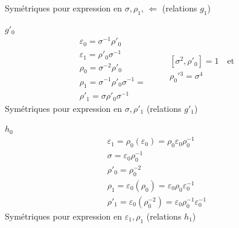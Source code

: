 Symétriques pour expression en $\sigma,\rho_1$, $\Leftarrow$ (relations $g_1$)

\textcircled{$g'_0$}
\[
\begin{gathered}
\varepsilon_0=\sigma^{-1}\rho'_0\\
\varepsilon_1=\rho'_0\sigma^{-1}\\
\rho_0=\sigma^{-2}\rho'_0\\
\rho_1=\sigma^{-1}\rho'_0\sigma^{-1}=\\
\rho'_1=\sigma\rho'_0\sigma^{-1}
\end{gathered}
\qquad\boxed{\begin{gathered}[\sigma^2,\rho'_0]=1\quad\text{et}\\\rho_0'{}^3=\sigma^4\end{gathered}}
\]
Symétriques pour expression en $\sigma,\rho'_1$ (relations $g'_1$)

\textcircled{$h_0$}
\[
\begin{gathered}
\varepsilon_1=\rho_0(\varepsilon_0)=\rho_0\varepsilon_0\rho_0^{-1}\\
\sigma=\varepsilon_0\rho_0^{-1}\\
\rho'_0=\rho_0^{-2}\\
\rho_1=\varepsilon_0(\rho_0)=\varepsilon_0\rho_0\varepsilon_0^{-1}\\
\rho'_1=\varepsilon_0(\rho_0^{-2})=\varepsilon_0\rho_0^{-1}\varepsilon_0^{-1}
\end{gathered}
\]
Symétriques pour expression en $\varepsilon_1,\rho_1$ (relations $h_1$)

